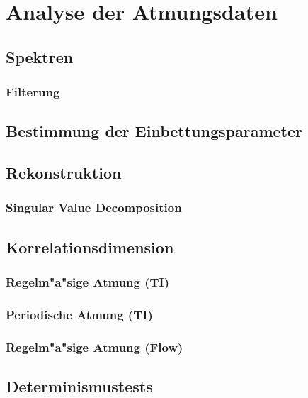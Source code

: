 {\section{Analyse der Atmungsdaten}

\subsection{Spektren}

\subsubsection{Filterung}

\subsection{Bestimmung der Einbettungsparameter}

\subsection{Rekonstruktion}

\subsubsection{Singular Value Decomposition}

\subsection{Korrelationsdimension}

\subsubsection{Regelm"a"sige Atmung (TI)}

\subsubsection{Periodische Atmung (TI)}

\subsubsection{Regelm"a"sige Atmung (Flow)}

\subsection{Determinismustests}

}
